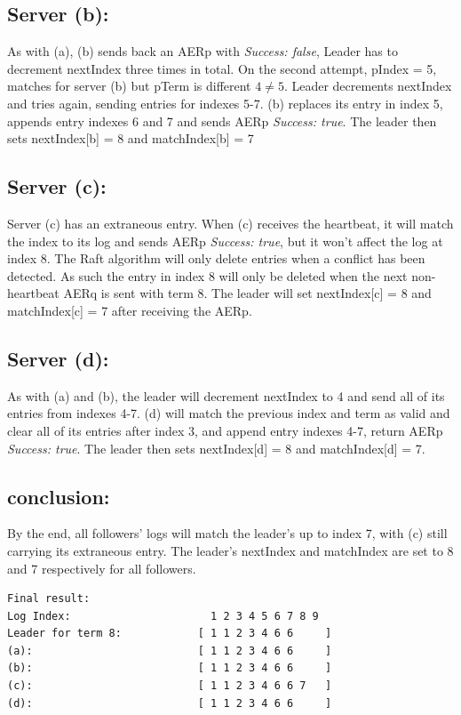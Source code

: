 \documentclass[a4paper,11pt]{article}
\begin{document}
\subsection*{Server (b):}
As with (a), (b) sends back an AERp with \textit{Success: false}, Leader has to decrement nextIndex three times in total. On the second attempt, pIndex = 5, matches for server (b) but pTerm is different $4\neq5$. Leader decrements nextIndex and tries again, sending entries for indexes 5-7. (b) replaces its entry in index 5, appends entry indexes 6 and 7 and sends AERp \textit{Success: true}. The leader then sets nextIndex[b] = 8 and matchIndex[b] = 7

\newpage

\subsection*{Server (c):}
Server (c) has an extraneous entry. When (c) receives the heartbeat, it will match the index to its log and sends AERp \textit{Success: true}, but it won't affect the log at index 8. The Raft algorithm will only delete entries when a conflict has been detected. As such the entry in index 8 will only be deleted when the next non-heartbeat AERq is sent with term 8. The leader will set nextIndex[c] = 8 and matchIndex[c] = 7 after receiving the AERp.

\subsection*{Server (d):}
As with (a) and (b), the leader will decrement nextIndex to 4 and send all of its entries from indexes 4-7. (d) will match the previous index and term as valid and clear all of its entries after index 3, and append entry indexes 4-7, return AERp \textit{Success: true}. The leader then sets nextIndex[d] = 8 and matchIndex[d] = 7.

\subsection*{conclusion:}
By the end, all followers' logs will match the leader's up to index 7, with (c) still carrying its extraneous entry. The leader's nextIndex and matchIndex are set to 8 and 7 respectively for all followers.

\begin{verbatim}
Final result:
Log Index:                      1 2 3 4 5 6 7 8 9
Leader for term 8:            [ 1 1 2 3 4 6 6     ]
(a):                          [ 1 1 2 3 4 6 6     ]
(b):                          [ 1 1 2 3 4 6 6     ]
(c):                          [ 1 1 2 3 4 6 6 7   ]
(d):                          [ 1 1 2 3 4 6 6     ]
\end{verbatim}
\end{document}
